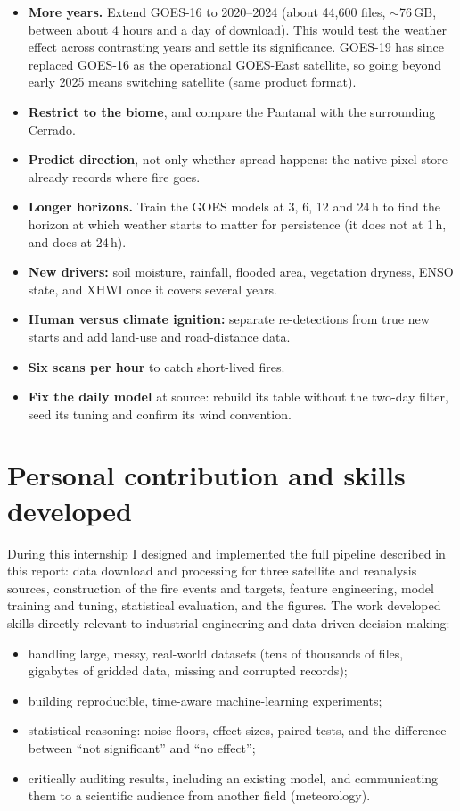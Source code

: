 \documentclass[11pt,a4paper,oneside]{report}
\begin{document}
\begin{itemize}
  \item \textbf{More years.} Extend GOES-16 to 2020--2024 (about 44{,}600 files,
        $\sim$76\,GB, between about 4 hours and a day of download). This would test the weather effect
        across contrasting years and settle its significance. GOES-19 has since
        replaced GOES-16 as the operational GOES-East satellite, so going beyond
        early 2025 means switching satellite (same product format).
  \item \textbf{Restrict to the biome}, and compare the Pantanal with the
        surrounding Cerrado.
  \item \textbf{Predict direction}, not only whether spread happens: the native
        pixel store already records where fire goes.
  \item \textbf{Longer horizons.} Train the GOES models at 3, 6, 12 and 24\,h to
        find the horizon at which weather starts to matter for persistence (it
        does not at 1\,h, and does at 24\,h).
  \item \textbf{New drivers:} soil moisture, rainfall, flooded area, vegetation
        dryness, ENSO state, and XHWI once it covers several years.
  \item \textbf{Human versus climate ignition:} separate re-detections from true
        new starts and add land-use and road-distance data.
  \item \textbf{Six scans per hour} to catch short-lived fires.
  \item \textbf{Fix the daily model} at source: rebuild its table without the
        two-day filter, seed its tuning and confirm its wind convention.
\end{itemize}

\section{Personal contribution and skills developed}

During this internship I designed and implemented the full pipeline described in
this report: data download and processing for three satellite and reanalysis
sources, construction of the fire events and targets, feature engineering,
model training and tuning, statistical evaluation, and the figures. The work
developed skills directly relevant to industrial engineering and data-driven
decision making:
\begin{itemize}
  \item handling large, messy, real-world datasets (tens of thousands of files,
        gigabytes of gridded data, missing and corrupted records);
  \item building reproducible, time-aware machine-learning experiments;
  \item statistical reasoning: noise floors, effect sizes, paired tests, and the
        difference between \enquote{not significant} and \enquote{no effect};
  \item critically auditing results, including an existing model, and
        communicating them to a scientific audience from another field
        (meteorology).
\end{itemize}
\end{document}

